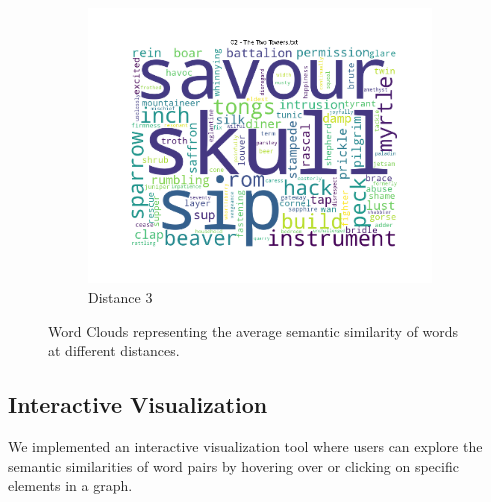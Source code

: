 \documentclass{article}
\begin{document}
\begin{figure}[H]
    \begin{subfigure}[b]{0.3\textwidth}
        \includegraphics[width=\textwidth]{img/Word Cloud3.png}
        \caption{Distance 3}
        \label{fig:wordcloud_3}
    \end{subfigure}
    \caption{Word Clouds representing the average semantic similarity of words at different distances.}
    \label{fig:wordclouds}
\end{figure}

\subsection{Interactive Visualization}

We implemented an interactive visualization tool where users can explore the semantic similarities of word pairs by hovering over or clicking on specific elements in a graph.
\end{document}
